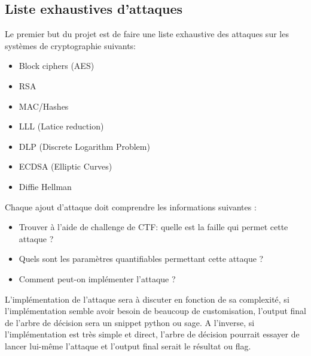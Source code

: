 \documentclass[12pt]{article}
\begin{document}
    \subsection{Liste exhaustives d'attaques}
    Le premier but du projet est de faire une liste exhaustive des attaques sur les systèmes de cryptographie suivants:
    \begin{itemize}
    	\item Block ciphers (AES)
    	\item RSA
    	\item MAC/Hashes
    	\item LLL (Latice reduction)
    	\item DLP (Discrete Logarithm Problem)
    	\item ECDSA (Elliptic Curves)
    	\item Diffie Hellman
    \end{itemize}
	Chaque ajout d'attaque doit comprendre les informations suivantes :
	\begin{itemize}
		\item Trouver à l'aide de challenge de CTF: quelle est la faille qui permet cette attaque ?
		\item Quels sont les paramètres quantifiables permettant cette attaque ?
		\item Comment peut-on implémenter l'attaque ?
	\end{itemize}
	L'implémentation de l'attaque sera à discuter en fonction de sa complexité, si l'implémentation semble avoir besoin de beaucoup de customisation, l'output final de l'arbre de décision sera un snippet python ou sage. A l'inverse, si l'implémentation est très simple et direct, l'arbre de décision pourrait essayer de lancer lui-même l'attaque et l'output final serait le résultat ou flag.
\end{document}

